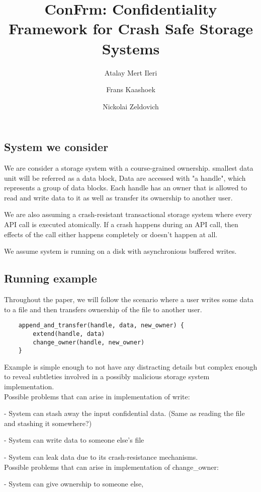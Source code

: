 \documentclass[onecolumn]{paper}
\title{ConFrm: Confidentiality Framework for Crash Safe Storage Systems}
\author{Atalay Mert Ileri \and Frans Kaashoek \and Nickolai Zeldovich}
\begin{document}
\maketitle

\subsection*{System we consider}
We are consider a storage system with a course-grained ownership. smallest data unit will be referred as a data block, Data are accessed with "a handle", which represents a group of data blocks. Each handle has an owner that is allowed to read and write data to it as well as transfer its ownership to another user.

We are also assuming a crash-resistant transactional storage system where every API call is executed atomically. If a crash happens during an API call, then effects of the call either happens completely or doesn't happen at all.

We assume system is running on a disk with asynchronious buffered writes. 

\subsection*{Running example}
Throughout the paper, we will follow the scenario where a user writes some data to a file and then transfers ownership of the file to another user.
\begin{verbatim}
	append_and_transfer(handle, data, new_owner) {
		extend(handle, data)
		change_owner(handle, new_owner)
	}
\end{verbatim}
Example is simple enough to not have any distracting details but complex enough to reveal subtleties involved in a possibly malicious storage system implementation.\\

Possible problems that can arise in implementation of write:

- System can stash away the input confidential data. 
	(Same as reading the file and stashing it somewhere?)

- System can write data to someone else's file

- System can leak data due to its crash-resistance mechanisms.\\

Possible problems that can arise in implementation of change\_owner:

- System can give ownership to someone else,
\end{document}
